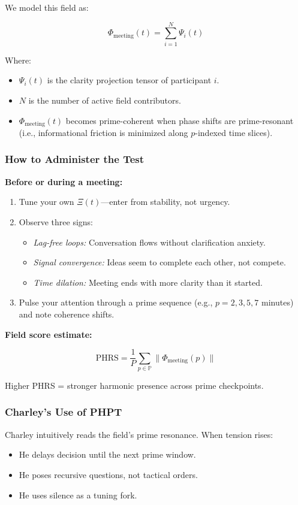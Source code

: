 \documentclass[12pt]{article}
\begin{document}
We model this field as:

\[
\Phi_{\text{meeting}}(t) = \sum_{i=1}^{N} \Psi_i(t)
\]

Where:
\begin{itemize}
    \item $\Psi_i(t)$ is the clarity projection tensor of participant $i$.
    \item $N$ is the number of active field contributors.
    \item $\Phi_{\text{meeting}}(t)$ becomes prime-coherent when phase shifts are prime-resonant (i.e., informational friction is minimized along $p$-indexed time slices).
\end{itemize}

\subsubsection*{How to Administer the Test}

\textbf{Before or during a meeting:}
\begin{enumerate}
    \item Tune your own $\Xi(t)$—enter from stability, not urgency.
    \item Observe three signs:
        \begin{itemize}
            \item \textit{Lag-free loops:} Conversation flows without clarification anxiety.
            \item \textit{Signal convergence:} Ideas seem to complete each other, not compete.
            \item \textit{Time dilation:} Meeting ends with more clarity than it started.
        \end{itemize}
    \item Pulse your attention through a prime sequence (e.g., $p = 2, 3, 5, 7$ minutes) and note coherence shifts.
\end{enumerate}

\textbf{Field score estimate:}

\[
\text{PHRS} = \frac{1}{P} \sum_{p \in \mathbb{P}} \|\Phi_{\text{meeting}}(p)\|
\]

Higher PHRS = stronger harmonic presence across prime checkpoints.

\subsubsection*{Charley’s Use of PHPT}

Charley intuitively reads the field’s prime resonance. When tension rises:
\begin{itemize}
    \item He delays decision until the next prime window.
    \item He poses recursive questions, not tactical orders.
    \item He uses silence as a tuning fork.
\end{itemize}
\end{document}

